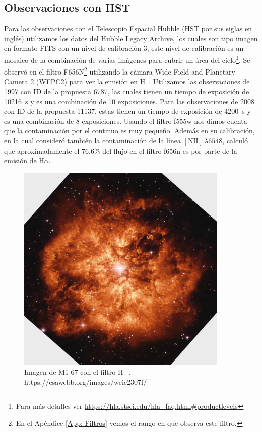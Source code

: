 \documentclass{book}
\begin{document}
\subsection{Observaciones con HST}

Para las observaciones con el Telescopio Espacial Hubble (HST por sus siglas en inglés) utilizamos los datos del Hubble Legacy Archive, los cuales son tipo imagen en formato FITS con un nivel de calibración 3, este nivel de calibración es un mosaico de la combinación de varias imágenes para cubrir un área del cielo\footnote{Para más detalles ver \url{https://hla.stsci.edu/hla_faq.html\#productlevels}}.  Se observó en el filtro F656N\footnote{En el Apéndice \ref{App: Filtros} vemos el rango en que observa este filtro.} utilizando la cámara Wide Field and Planetary Camera 2 (WFPC2) para ver la emisión en \unit{H\alpha}. Utilizamos las observaciones de 1997 con ID de la propuesta 6787, las cuales tienen un tiempo de exposición de \SI{10 216}{s} y es una combinación de 10 exposiciones. Para las observaciones de 2008 con ID de la propuesta 11137, estas tienen un tiempo de exposición de \SI{4200}{s} y es una combinación de 8 exposiciones. Usando el filtro f555w nos dimos cuenta que la contaminación por el continuo es muy pequeño. Además \cite{Grosdidier:1998} en su calibración,  en la cual consideró también la contaminación de la línea $[\mathrm{N\scriptstyle{II}}]\,\lambda6548$, calculó que aproximadamente el $76.6\%$ del flujo en el filtro f656n es por parte de la emisión de H$\alpha$.

\begin{figure}[htb]
    \centering
    \includegraphics[width=0.9\textwidth]{m1-67-comp-full-hst.jpg}
    \caption{Imagen de M1-67 con el filtro \unit{H\alpha} \citep{Grosdidier:1998}. https://esawebb.org/images/weic2307f/}
    \label{fig:M1-67HST}
\end{figure}
\end{document}
